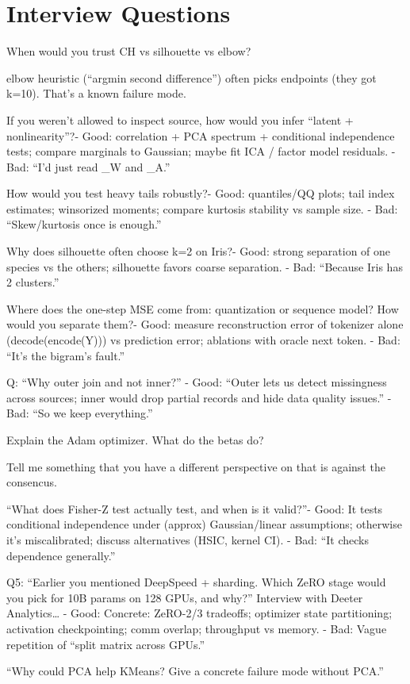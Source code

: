\chapter{Interview Questions}

When would you trust CH vs silhouette vs elbow?

elbow heuristic (“argmin second difference”) often picks endpoints (they got k=10). That’s a known failure mode.

If you weren’t allowed to inspect source, how would you infer “latent + nonlinearity”?- Good: correlation + PCA spectrum + conditional independence tests; compare marginals to Gaussian; maybe fit ICA / factor model residuals.
- Bad: “I’d just read _W and _A.”

How would you test heavy tails robustly?- Good: quantiles/QQ plots; tail index estimates; winsorized moments; compare kurtosis stability vs sample size.
- Bad: “Skew/kurtosis once is enough.”


Why does silhouette often choose k=2 on Iris?- Good: strong separation of one species vs the others; silhouette favors coarse separation.
- Bad: “Because Iris has 2 clusters.”


Where does the one-step MSE come from: quantization or sequence model? How would you separate them?- Good: measure reconstruction error of tokenizer alone (decode(encode(Y))) vs prediction error; ablations with oracle next token.
- Bad: “It’s the bigram’s fault.”

Q: “Why outer join and not inner?”  
- Good: “Outer lets us detect missingness across sources; inner would drop partial records and hide data quality issues.”
- Bad: “So we keep everything.”

Explain the Adam optimizer. What do the betas do?

Tell me something that you have a different perspective on that is against the consencus. 

“What does Fisher-Z test actually test, and when is it valid?”- Good: It tests conditional independence under (approx) Gaussian/linear assumptions; otherwise it’s miscalibrated; discuss alternatives (HSIC, kernel CI).
- Bad: “It checks dependence generally.”

Q5: “Earlier you mentioned DeepSpeed + sharding. Which ZeRO stage would you pick for 10B params on 128 GPUs, and why?”     Interview with Deeter Analytics…  
- Good: Concrete: ZeRO-2/3 tradeoffs; optimizer state partitioning; activation checkpointing; comm overlap; throughput vs memory.
- Bad: Vague repetition of “split matrix across GPUs.”

“Why could PCA help KMeans? Give a concrete failure mode without PCA.”
